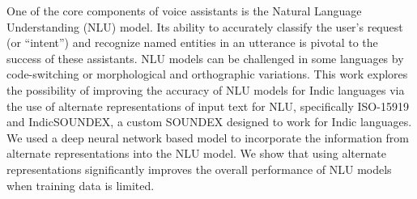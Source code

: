 One of the core components of voice assistants is the Natural Language Understanding (NLU) model. Its ability to accurately classify the user's request (or ``intent'') and recognize named entities in an utterance is pivotal to the success of these assistants. NLU models can be challenged in some languages by code-switching or morphological and orthographic variations. This work explores the possibility of improving the accuracy of NLU models for Indic languages via the use of alternate representations of input text for NLU, specifically ISO-15919 and IndicSOUNDEX, a custom SOUNDEX designed to work for Indic languages. We used a deep neural network based model to incorporate the information from alternate representations into the NLU model. We show that using alternate representations significantly improves the overall performance of NLU models when training data is limited.
